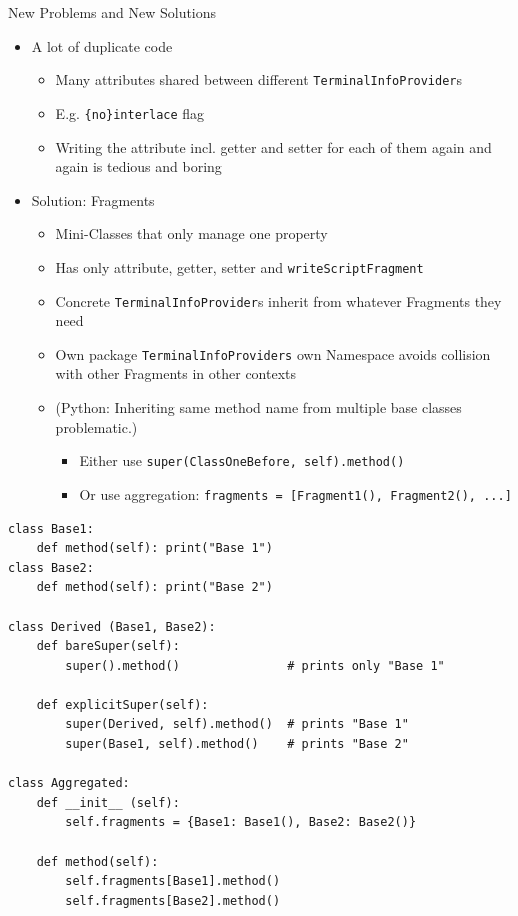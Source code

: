 \begin{frame}{New Problems and New Solutions}
%
\begin{itemize}
\item A lot of duplicate code
	\begin{itemize}
	\item Many attributes shared between different \texttt{TerminalInfoProvider}s
	\item E.\;g. \texttt{\{no\}interlace} flag
	\item Writing the attribute incl. getter and setter for each of them again and again is tedious and boring
	\end{itemize}
	\pause
\item Solution: Fragments
	\begin{itemize}
	\item Mini-Classes that only manage one property
	\item Has only attribute, getter, setter and \texttt{writeScriptFragment}
	\item Concrete \texttt{TerminalInfoProvider}s inherit from whatever Fragments they need
	\item Own package \texttt{TerminalInfoProviders} \Thus own Namespace avoids collision with other Fragments in other contexts
		\pause
	\item (Python: Inheriting same method name from multiple base classes problematic.)
		\begin{itemize}
		\item Either use \texttt{super(ClassOneBefore, self).method()}
		\item Or use aggregation: \texttt{fragments = [Fragment1(), Fragment2(), ...]}
		\end{itemize}
	\end{itemize}
\end{itemize}
%
\end{frame}


\begin{frame}[fragile]
%
\vspace{-5pt}
\begin{codebox}
\begin{verbatim}
class Base1:
    def method(self): print("Base 1")
class Base2:
    def method(self): print("Base 2")

class Derived (Base1, Base2):
    def bareSuper(self):
        super().method()               # prints only "Base 1"

    def explicitSuper(self):
        super(Derived, self).method()  # prints "Base 1"
        super(Base1, self).method()    # prints "Base 2"

class Aggregated:
    def __init__ (self):
        self.fragments = {Base1: Base1(), Base2: Base2()}

    def method(self):
        self.fragments[Base1].method()
        self.fragments[Base2].method()
\end{verbatim}
\end{codebox}
%
\end{frame}

